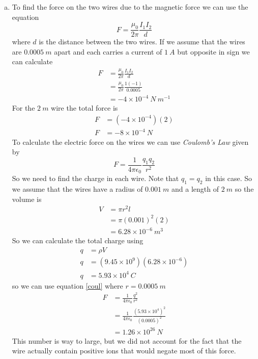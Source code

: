 \documentclass[11pt]{article}
\numberwithin{equation}{section}
\newcommand{\kapa}{\frac{1}{4\pi\epsilon_0}}
\begin{document}
\begin{enumerate}[(a)]
\item
To find the force on the two wires due to the magnetic force we can use the equation
\begin{equation}
F = \frac{\mu_0}{2\pi}\frac{I_1I_2}{d}
\label{magfor}
\end{equation}
where $d$ is the distance between the two wires. If we assume that the wires are $0.0005\ m$ apart and each carries a current of $1\ A$ but opposite in sign we can calculate
\begin{align*}
F &= \frac{\mu_0}{2\pi}\frac{I_1I_2}{d}\\
&= \frac{\mu_0}{2\pi}\frac{1(-1)}{0.0005}\\
&= -4\times10^{-4}\ N\ m^{-1}
\end{align*}
For the $2\ m$ wire the total force is
\begin{align*}
F &= (-4\times10^{-4})(2)\\
F &= -8\times10^{-4}\ N
\end{align*}
To calculate the electric force on the wires we can use \emph{Coulomb's Law} given by
\begin{equation}
F = \kapa\frac{q_1q_2}{r^2}
\label{coul}
\end{equation}
So we need to find the charge in each wire. Note that $q_1=q_2$ in this case. So we assume that the wires have a radius of $0.001\ m$ and a length of $2\ m$ so the volume is
\begin{align*}
V &= \pi r^2l\\
&= \pi (0.001)^2(2)\\
&= 6.28\times10^{-6}\ m^3
\end{align*}
So we can calculate the total charge using
\begin{align*}
q &= \rho V\\
q &= (9.45\times10^9)(6.28\times10^{-6})\\
q &= 5.93\times10^4\ C
\end{align*}
so we can use equation \ref{coul} where $r=0.0005\ m$
\begin{align*}
F &= \kapa\frac{q^2}{r^2}\\
&= \kapa\frac{(5.93\times10^4)^2}{(0.0005)^2}\\
&= 1.26\times10^{26}\ N
\end{align*}
This number is way to large, but we did not account for the fact that the wire actually contain positive ions that would negate most of this force.



\end{enumerate}
\end{document}

